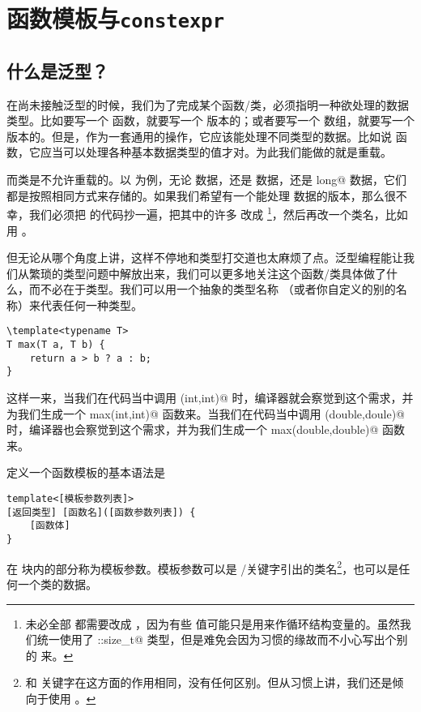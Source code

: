 \section{函数模板与\texttt{constexpr}}
\subsection*{什么是泛型？}
在尚未接触泛型的时候，我们为了完成某个函数/类，必须指明一种欲处理的数据类型。比如要写一个 \lstinline@max@ 函数，就要写一个 \lstinline@double@ 版本的；或者要写一个 \lstinline@valarray@ 数组，就要写一个 \lstinline@int@ 版本的。但是，作为一套通用的操作，它应该能处理不同类型的数据。比如说 \lstinline@max@ 函数，它应当可以处理各种基本数据类型的值才对。为此我们能做的就是重载。\par
而类是不允许重载的。以 \lstinline@valarray@ 为例，无论 \lstinline@int@ 数据，还是 \lstinline@double@ 数据，还是 \lstinline@long long@ 数据，它们都是按照相同方式来存储的。如果我们希望有一个能处理 \lstinline@double@ 数据的版本，那么很不幸，我们必须把 \lstinline@valarri@ 的代码抄一遍，把其中的许多 \lstinline@int@ 改成 \lstinline@double@\footnote{未必全部 \lstinline@int@ 都需要改成 \lstinline@double@，因为有些 \lstinline@int@ 值可能只是用来作循环结构变量的。虽然我们统一使用了 \lstinline@std::size_t@ 类型，但是难免会因为习惯的缘故而不小心写出个别的 \lstinline@int@ 来。}，然后再改一个类名，比如用 \lstinline@valarrd@。\par
但无论从哪个角度上讲，这样不停地和类型打交道也太麻烦了点。泛型编程能让我们从繁琐的类型问题中解放出来，我们可以更多地关注这个函数/类具体做了什么，而不必在于类型。我们可以用一个抽象的类型名称 \lstinline@T@（或者你自定义的别的名称）来代表任何一种类型。
\begin{lstlisting}
\template<typename T>
T max(T a, T b) {
    return a > b ? a : b;
}
\end{lstlisting}
这样一来，当我们在代码当中调用 \lstinline@max(int,int)@ 时，编译器就会察觉到这个需求，并为我们生成一个 \lstinline@int max(int,int)@ 函数来。当我们在代码当中调用 \lstinline@max(double,doule)@ 时，编译器也会察觉到这个需求，并为我们生成一个 \lstinline@double max(double,double)@ 函数来。\par
定义一个函数模板的基本语法是
\begin{lstlisting}
template<[模板参数列表]>
[返回类型] [函数名]([函数参数列表]) {
    [函数体]
}
\end{lstlisting}
在 \lstinline@template@ 块内的部分称为模板参数。模板参数可以是 \lstinline@typename@/\lstinline@class@ 关键字引出的类名\footnote{\lstinline@typename@ 和 \lstinline@class@ 关键字在这方面的作用相同，没有任何区别。但从习惯上讲，我们还是倾向于使用 \lstinline@typename@。}，也可以是任何一个类的数据。
